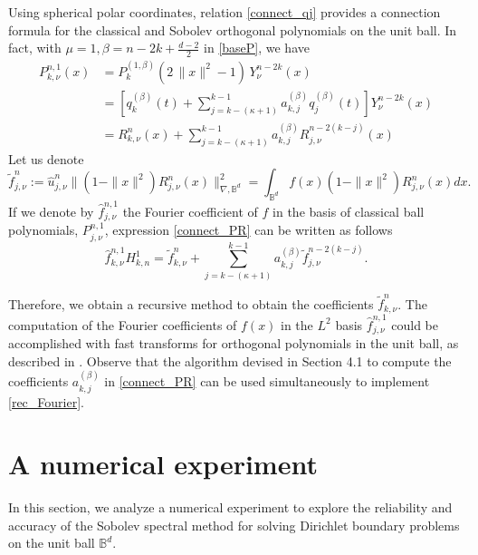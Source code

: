 \documentclass{amsart}
\theoremstyle{plain}%
\theoremstyle{definition}
\theoremstyle{remark}
\begin{document}
Using spherical polar coordinates, relation \eqref{connect_qj} provides a connection formula for the classical and Sobolev orthogonal polynomials on the unit ball. In fact, with \(\mu = 1, \beta = n-2k + \frac{d-2}{2}\) in \eqref{baseP}, we have
\begin{align}
P_{k,\nu}^{n,1}(x) & = P_{k}^{(1, \beta)}(2\,\|x\|^2 -1)\, Y_\nu^{n-2k}(x)\nonumber \\
 & = \left[q_k^{(\beta)}(t) + \sum_{j=k-(\kappa+1)}^{k-1}  a^{(\beta)}_{k,j} q_j^{(\beta)}(t)\right]Y_\nu^{n-2k}(x)\nonumber \\
& = R_{k,\nu}^{n}(x) + \sum_{j=k-(\kappa+1)}^{k-1} a^{(\beta)}_{k,j} R_{j,\nu}^{n-2(k-j)}(x)\label{connect_PR}
\end{align}
Let us denote
\[
\widetilde{f}_{j,\nu}^{n} := \widehat{u}_{j,\nu}^{n} \|(1-\|x\|^2) R_{j,\nu}^n(x)\|_{\nabla,\mathbb{B}^d}^2 = \int_{\mathbb{B}^d}f(x) (1-\|x\|^2) R_{j,\nu}^n(x) dx.
\]
If we denote by $\widehat{f}_{j,\nu}^{n,1}$ the  Fourier coefficient of $f$ in the basis of classical
ball polynomials, $P_{j,\nu}^{n,1}$, expression \eqref{connect_PR} can be written as follows
\begin{equation} \label{rec_Fourier}
\widehat{f}_{k,\nu}^{n,1} H_{k,n}^{1}  = \widetilde{f}_{k,\nu}^{n} + \sum_{j=k-(\kappa+1)}^{k-1} a^{(\beta)}_{k,j} \widetilde{f}_{j,\nu}^{n-2(k-j)}.
\end{equation}

Therefore, we obtain a recursive method to obtain the coefficients \(\widetilde{f}_{k,\nu}^{n}\).
The computation of the Fourier coefficients of \(f(x)\) in the \(L^2\) basis \(\widehat{f}_{j,\nu}^{n,1}\) could be accomplished with
fast transforms for orthogonal polynomials in the unit ball, as described in \cite{OX}. Observe that the algorithm devised in Section 4.1 to compute the coefficients \(a^{(\beta)}_{k,j}\) in \eqref{connect_PR} can be used simultaneously to implement \eqref{rec_Fourier}.



\section{A numerical experiment}
\setcounter{equation}{0}

In this section, we analyze a numerical experiment to explore the reliability and accuracy of the Sobolev spectral method for solving Dirichlet boundary problems on the unit ball $\mathbb{B}^d$.
\end{document}
